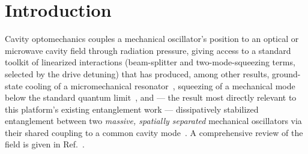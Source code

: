 \documentclass[aps,prapplied,reprint,superscriptaddress,longbibliography]{revtex4-2}
\begin{document}
\maketitle

\section{Introduction}

Cavity optomechanics couples a mechanical oscillator's position to an optical or microwave cavity
field through radiation pressure, giving access to a standard toolkit of linearized interactions
(beam-splitter and two-mode-squeezing terms, selected by the drive detuning) that has produced, among
other results, ground-state cooling of a micromechanical
resonator~\cite{teufel2011sideband}, squeezing of a mechanical mode below the standard quantum
limit~\cite{pirkkalainen2015squeezing}, and — the result most directly relevant to this
platform's existing entanglement work — dissipatively stabilized entanglement between two
\emph{massive, spatially separated} mechanical oscillators via their shared coupling to a common
cavity mode~\cite{ockeloenkorppi2018stabilized}. A comprehensive review of the field is given in
Ref.~\cite{aspelmeyer2014cavity}.
\end{document}

